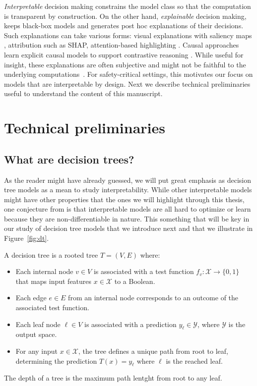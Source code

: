 \textit{Interpretable} decision making constrains the model class so that the computation is transparent by construction. 
On the other hand, \textit{explainable} decision making, keeps black-box models and generates post hoc explanations of their decisions. 
Such explanations can take various forms: visual explanations with saliency maps \cite{Puri2020Explain}, attribution such as SHAP\cite{shap}, attention-based highlighting \cite{attention}.
Causal approaches learn explicit causal models to support contrastive reasoning \cite{madumal}.
While useful for insight, these explanations are often subjective and might not be faithful to the underlying computations~\cite{Atrey2020Exploratory}.
For safety-critical settings, this motivates our focus on models that are interpretable by design.
Next we describe technical preliminaries useful to understand the content of this manuscript.

\section{Technical preliminaries}

\subsection{What are decision trees?}

As the reader might have already guessed, we will put great emphasis as decision tree models as a mean to study interpretability.
While other interpretable models might have other properties that the ones we will highlight through this thesis, one conjecture from \cite{glanois-survey} is that interpretable models are all hard to optimize or learn because they are non-differentiable in nature.
This something that will be key in our study of decision tree models that we introduce next and that we illustrate in Figure~\ref{fig:dt}.

\begin{definition}
    A decision tree is a rooted tree $T = (V, E)$ where:
    \begin{itemize}
    \item Each internal node $v \in V$ is associated with a test function $f_v: \mathcal{X} \rightarrow \{0, 1\}$ that maps input features $x \in \mathcal{X}$ to a Boolean.
    \item Each edge $e \in E$ from an internal node corresponds to an outcome of the associated test function.
    \item Each leaf node $\ell \in V$ is associated with a prediction $y_\ell \in \mathcal{Y}$, where $\mathcal{Y}$ is the output space.
    \item For any input $x \in \mathcal{X}$, the tree defines a unique path from root to leaf, determining the prediction $T(x) = y_\ell$ where $\ell$ is the reached leaf.
    \end{itemize}
    The depth of a tree is the maximum path lentght from root to any leaf.
    \end{definition}

